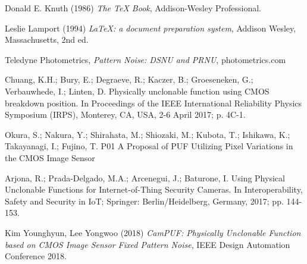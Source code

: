 \begin{thebibliography}{9}
Donald E. Knuth (1986) \emph{The \TeX{} Book}, Addison-Wesley Professional.

Leslie Lamport (1994) \emph{\LaTeX: a document preparation system}, Addison
Wesley, Massachusetts, 2nd ed.

Teledyne Photometrics, \emph{Pattern Noise: DSNU and PRNU}, photometrics.com

Chuang, K.H.; Bury, E.; Degraeve, R.; Kaczer, B.; Groeseneken, G.; Verbauwhede, I.; Linten, D. Physically unclonable function
using CMOS breakdown position. In Proceedings of the IEEE International Reliability Physics Symposium (IRPS), Monterey, CA,
USA, 2-6 April 2017; p. 4C-1.

Okura, S.; Nakura, Y.; Shirahata, M.; Shiozaki, M.; Kubota, T.; Ishikawa, K.; Takayanagi, I.; Fujino, T. P01 A Proposal of PUF
Utilizing Pixel Variations in the CMOS Image Sensor

Arjona, R.; Prada-Delgado, M.A.; Arcenegui, J.; Baturone, I. Using Physical Unclonable Functions for Internet-of-Thing Security
Cameras. In Interoperability, Safety and Security in IoT; Springer: Berlin/Heidelberg, Germany, 2017; pp. 144-153.

Kim Younghyun, Lee Yongwoo (2018) \emph{CamPUF: Physically Unclonable Function based on CMOS Image Sensor Fixed Pattern Noise}, IEEE Design Automation Conference 2018.

\end{thebibliography}
